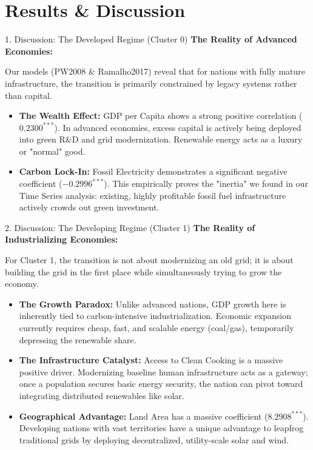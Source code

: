 \documentclass[aspectratio=169]{beamer}
\begin{document}
\section{Results \& Discussion}

\begin{frame}{1. Discussion: The Developed Regime (Cluster 0)}
  \textbf{The Reality of Advanced Economies:}
  \vspace{0.2cm}
  
  Our models (PW2008 \& Ramalho2017) reveal that for nations with fully mature infrastructure, the transition is primarily constrained by legacy systems rather than capital.
  
  \vspace{0.3cm}
  \begin{itemize}
      \item \textbf{The Wealth Effect:} GDP per Capita shows a strong positive correlation ($0.2300^{***}$). In advanced economies, excess capital is actively being deployed into green R\&D and grid modernization. Renewable energy acts as a luxury or "normal" good.
      \item \textbf{Carbon Lock-In:} Fossil Electricity demonstrates a significant negative coefficient ($-0.2996^{***}$). This empirically proves the "inertia" we found in our Time Series analysis: existing, highly profitable fossil fuel infrastructure actively crowds out green investment.
  \end{itemize}
\end{frame}

\begin{frame}{2. Discussion: The Developing Regime (Cluster 1)}
  \textbf{The Reality of Industrializing Economies:}
  \vspace{0.2cm}
  
  For Cluster 1, the transition is not about modernizing an old grid; it is about building the grid in the first place while simultaneously trying to grow the economy.
  
  \vspace{0.3cm}
  \begin{itemize}
      \item \textbf{The Growth Paradox:} Unlike advanced nations, GDP growth here is inherently tied to carbon-intensive industrialization. Economic expansion currently requires cheap, fast, and scalable energy (coal/gas), temporarily depressing the renewable share.
      \item \textbf{The Infrastructure Catalyst:} Access to Clean Cooking is a massive positive driver. Modernizing baseline human infrastructure acts as a gateway; once a population secures basic energy security, the nation can pivot toward integrating distributed renewables like solar.
      \item \textbf{Geographical Advantage:} Land Area has a massive coefficient ($8.2908^{***}$). Developing nations with vast territories have a unique advantage to leapfrog traditional grids by deploying decentralized, utility-scale solar and wind.
  \end{itemize}
\end{frame}
\end{document}
